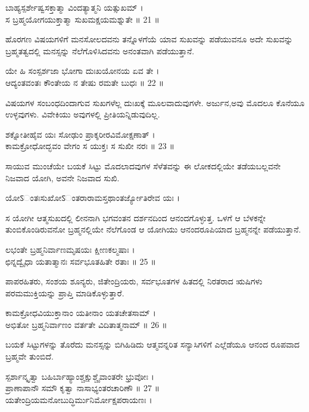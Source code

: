 ಬಾಹ್ಯಸ್ಪರ್ಶೇಷ್ವಸಕ್ತಾತ್ಮಾ ವಿಂದತ್ಯಾತ್ಮನಿ ಯತ್ಸುಖಮ್ ।\\
ಸ ಬ್ರಹ್ಮಯೋಗಯುಕ್ತಾತ್ಮಾ ಸುಖಮಕ್ಷಯಮಶ್ನುತೇ ॥ 21 ॥
\begin{quoting}
ಹೊರಗಣ ವಿಷಯಗಳಿಗೆ ಮನಸೋಲದವನು ತನ್ನೊಳಗೆಯೆ ಯಾವ ಸುಖವನ್ನು ಪಡೆಯುವನೂ ಅದೇ ಸುಖವನ್ನು ಬ್ರಹ್ಮತತ್ವದಲ್ಲಿ ಮನಸ್ಸನ್ನು ನೆಲೆಗೊಳಿಸಿದವನು ಅನಂತವಾಗಿ ಪಡೆಯುತ್ತಾನೆ.\\
\end{quoting}
ಯೇ ಹಿ ಸಂಸ್ಪರ್ಶಜಾ ಭೋಗಾ ದುಃಖಯೋನಯ ಏವ ತೇ ।\\
ಆದ್ಯಂತವಂತಃ ಕೌಂತೇಯ ನ ತೇಷು ರಮತೇ ಬುಧಃ ॥ 22 ॥
\begin{quoting}
ವಿಷಯಗಳ ಸಂಬಂಧದಿಂದಾಗುವ ಸುಖಗಳೆಲ್ಲ ದುಃಖಕ್ಕೆ ಮೂಲವಾದುವುಗಳೇ. ಅರ್ಜುನ,ಅವು ಮೊದಲೂ ಕೊನೆಯೂ ಉಳ್ಳವುಗಳು. ವಿವೇಕಿಯು ಅವುಗಳಲ್ಲಿ ಪ್ರೀತಿಯನ್ನಿಡುವುದಿಲ್ಲ.\\
\end{quoting}
ಶಕ್ನೋತೀಹೈವ ಯಃ ಸೋಢುಂ ಪ್ರಾಕ್ಶರೀರವಿಮೋಕ್ಷಣಾತ್ ।\\
ಕಾಮಕ್ರೋಧೋದ್ಭವಂ ವೇಗಂ ಸ ಯುಕ್ತಃ ಸ ಸುಖೀ ನರಃ ॥ 23 ॥
\begin{quoting}
ಸಾಯುವ ಮುಂಚೆಯೇ ಬಯಕೆ ಸಿಟ್ಟು ಮೊದಲಾದವುಗಳ ಸೆಳೆತವನ್ನು ಈ ಲೋಕದಲ್ಲಿಯೇ ತಡೆಯಬಲ್ಲವನೇ ನಿಜವಾದ ಯೋಗಿ, ಅವನೇ ನಿಜವಾದ ಸುಖಿ.\\
\end{quoting}
ಯೋऽಂತಃಸುಖೋऽಂತರಾರಾಮಸ್ತಥಾಂತರ್ಜ್ಯೋತಿರೇವ ಯಃ ।
\begin{quoting}
ಸ ಯೋಗೀ  ಆತ್ಮಸುಖದಲ್ಲಿ ಲೀನನಾಗಿ ಭಗವಂತನ ದರ್ಶನದಿಂದ ಆನಂದಗೊಳ್ಳುತ್ತ. ಒಳಗೆ ಆ ಬೆಳಕನ್ನೇ ತುಂಬಿಕೊಂಡಿರುವನೋ ಬ್ರಹ್ಮನಲ್ಲಿಯೇ ನೆಲೆಗೊಂಡ ಆ ಯೋಗಿಯು ಆನಂದರೂಪಿಯಾದ ಬ್ರಹ್ಮನನ್ನೇ ಪಡೆಯುತ್ತಾನೆ.\\
\end{quoting}
ಲಭಂತೇ ಬ್ರಹ್ಮನಿರ್ವಾಣಮೃಷಯಃ ಕ್ಷೀಣಕಲ್ಮಷಾಃ ।\\
ಛಿನ್ನದ್ವೈಧಾ ಯತಾತ್ಮಾನಃ ಸರ್ವಭೂತಹಿತೇ ರತಾಃ ॥ 25 ॥
\begin{quoting}
ಪಾಪರಹಿತರು, ಸಂಶಯ ಶೂನ್ಯರು, ಜಿತೇಂದ್ರಿಯರು, ಸರ್ವಭೂತಗಳ ಹಿತದಲ್ಲಿ ನಿರತರಾದ ಋಷಿಗಳು ಪರಮಮುಕ್ತಿಯನ್ನು ಪ್ರಾಪ್ತಿ ಮಾಡಿಕೊಳ್ಳುತ್ತಾರೆ.\\
\end{quoting}
ಕಾಮಕ್ರೋಧವಿಯುಕ್ತಾನಾಂ ಯತೀನಾಂ ಯತಚೇತಸಾಮ್ ।\\
ಅಭಿತೋ ಬ್ರಹ್ಮನಿರ್ವಾಣಂ ವರ್ತತೇ ವಿದಿತಾತ್ಮನಾಮ್ ॥ 26 ॥
\begin{quoting}
ಬಯಕೆ ಸಿಟ್ಟುಗಳನ್ನು ತೊರೆದು ಮನಸ್ಸನ್ನು ಬಿಗಿಹಿಡಿದು ಆತ್ಮವನ್ನರಿತ ಸನ್ಯಾಸಿಗಳಿಗೆ ಎಲ್ಲೆಡೆಯೂ ಆನಂದ ರೂಪವಾದ ಬ್ರಹ್ಮವೇ ತುಂಬಿದೆ.\\
\end{quoting}
ಸ್ಪರ್ಶಾನ್ಕೃತ್ವಾ ಬಹಿರ್ಬಾಹ್ಯಾಂಶ್ಚಕ್ಷುಶ್ಚೈವಾಂತರೇ ಭ್ರುವೋಃ ।\\
ಪ್ರಾಣಾಪಾನೌ ಸಮೌ ಕೃತ್ವಾ ನಾಸಾಭ್ಯಂತರಚಾರಿಣೌ ॥ 27 ॥\\
ಯತೇಂದ್ರಿಯಮನೋಬುದ್ಧಿರ್ಮುನಿರ್ಮೋಕ್ಷಪರಾಯಣಃ ।\\

